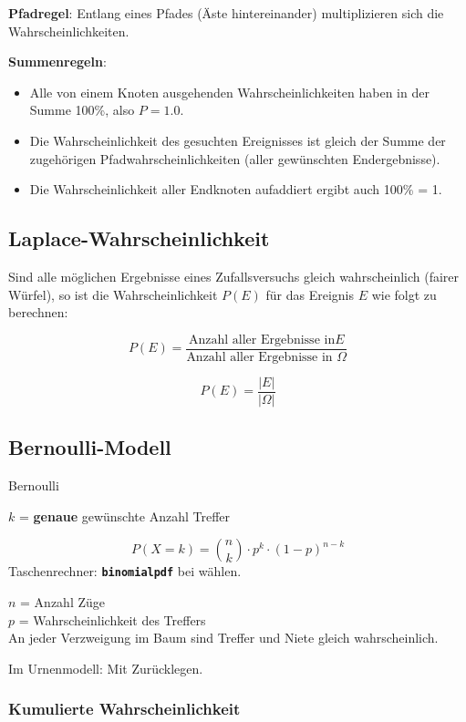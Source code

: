 \begin{multicols}{2}
\textbf{Pfadregel}:
Entlang eines Pfades (Äste hintereinander) multiplizieren sich die
Wahrscheinlichkeiten.

\textbf{Summenregeln}:
\begin{itemize}
\item Alle von einem Knoten ausgehenden Wahrscheinlichkeiten haben in
der Summe 100\%, also $P=1.0$.
\item Die Wahrscheinlichkeit des gesuchten Ereignisses ist gleich der
Summe der zugehörigen Pfadwahrscheinlichkeiten (aller gewünschten
Endergebnisse).
\item Die Wahrscheinlichkeit aller Endknoten aufaddiert ergibt auch
100\% = 1.
\end{itemize}


\subsection*{Laplace-Wahrscheinlichkeit}
Sind alle möglichen Ergebnisse eines Zufallsversuchs gleich
wahrscheinlich (fairer Würfel), so ist die Wahrscheinlichkeit $P(E)$ für das Ereignis
$E$ wie folgt zu berechnen:

$$P(E) = \frac{\textrm{Anzahl aller Ergebnisse in
}E}{\textrm{Anzahl aller Ergebnisse in }\Omega}$$


\begin{gesetz*}{}{}
$$P(E) = \frac{|E|}{|\Omega|}$$
\end{gesetz*}



\subsection*{Bernoulli-Modell}
\begin{gesetz*}{Bernoulli}{}

$k$ = \textbf{genaue} gewünschte Anzahl Treffer

$$P(X=k) = {n \choose k}\cdot{}p^k\cdot{}(1-p)^{n-k}$$
Taschenrechner:  \textbf{\texttt{binomialpdf}} bei
 wählen.

$n$ = Anzahl Züge\\
$p$ = Wahrscheinlichkeit des Treffers\\

An jeder Verzweigung im Baum sind Treffer und Niete gleich
wahrscheinlich.

Im Urnenmodell: Mit Zurücklegen.
\end{gesetz*}

\subsubsection*{Kumulierte Wahrscheinlichkeit}


\end{multicols}
